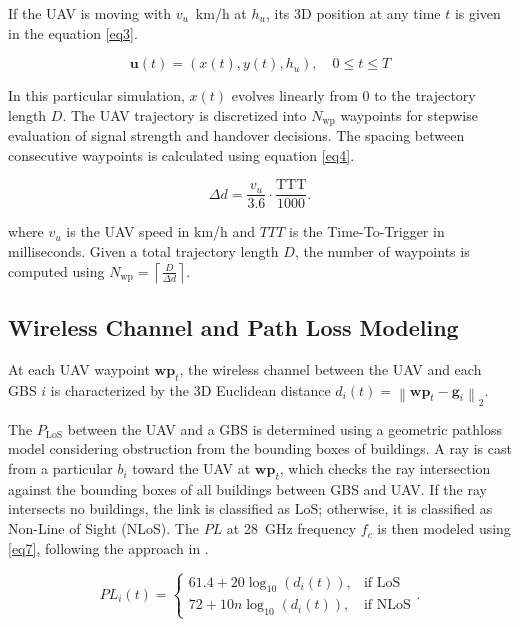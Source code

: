 \documentclass[10pt,conference]{IEEEtran}
\begin{document}
If the UAV is moving with $v_u$~km/h at $h_u$, its 3D position at any time $t$ is given in the equation \eqref{eq3}. 

\begin{equation}
\label{eq3} 
\mathbf{u}(t) = (x(t), y(t), h_u), \quad 0 \le t \le T
\end{equation}

In this particular simulation, $x(t)$ evolves linearly from 0 to the trajectory length $D$. The UAV trajectory is discretized into $N_{\text{wp}}$ waypoints for stepwise evaluation of signal strength and handover decisions. The spacing between consecutive waypoints is calculated using equation \eqref{eq4}. 

\begin{equation}
\label{eq4} 
\Delta d = \frac{v_u}{3.6} \cdot \frac{\mathrm{TTT}}{1000}.
\end{equation}

where $v_u$ is the UAV speed in km/h and $TTT$ is the Time-To-Trigger in milliseconds. Given a total trajectory length $D$, the number of waypoints is computed using $N_{\text{wp}} = \left\lceil \frac{D}{\Delta d} \right\rceil$.



\subsection{Wireless Channel and Path Loss Modeling}

At each UAV waypoint \(\mathbf{wp}_t\), the wireless channel between the UAV and each GBS $i$ is characterized by the 3D Euclidean distance $d_i(t) = \left\| \mathbf{wp}_t - \mathbf{g}_i \right\|_2$.


The $P_{\mathrm{LoS}}$ between the UAV and a GBS is determined using a geometric pathloss model considering obstruction from the bounding boxes of buildings. A ray is cast from a particular $b_i$ toward the UAV at $\mathbf{wp}_t$, which checks the ray intersection against the bounding boxes of all buildings between GBS and UAV. If the ray intersects no buildings, the link is classified as LoS; otherwise, it is classified as Non-Line of Sight (NLoS). The $PL$ at 28~GHz frequency $f_c$ is then modeled using \eqref{eq7}, following the approach in \cite{6834753}.

\begin{equation}
\label{eq7} 
PL_i(t) = 
\begin{cases}
61.4 + 20 \log_{10}(d_i(t)), & \text{if LoS} \\
72 +  10n\log_{10}(d_i(t)), & \text{if NLoS}
\end{cases}.
\end{equation}
\end{document}
